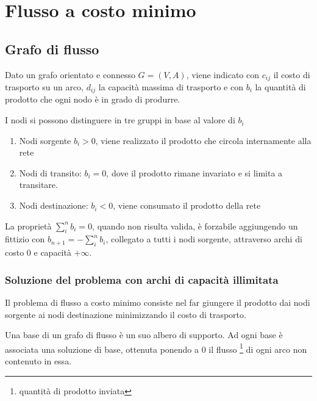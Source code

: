 \documentclass[../template]{subfiles}
\begin{document}
\section{Flusso a costo minimo}
\subsection{Grafo di flusso}
Dato un grafo orientato e connesso $G = (V, A)$, viene indicato con $c_{ij}$ il costo di trasporto su un arco, $d_{ij}$ la
capacità massima di trasporto e con $b_{i}$ la quantità di prodotto che ogni nodo è in grado di produrre.

I nodi si possono distinguere in tre gruppi in base al valore di $b_i$
\begin{enumerate}
    \item Nodi sorgente $b_i > 0$, viene realizzato il prodotto che circola internamente alla rete
    \item Nodi di transito: $b_i = 0$, dove il prodotto rimane invariato e si limita a transitare.
    \item Nodi destinazione: $b_i < 0$, viene consumato il prodotto della rete
\end{enumerate}
La proprietà $\sum_i^n b_i = 0$, quando non risulta valida, è forzabile aggiungendo un fittizio
con $b_{n+1} = -\sum_i^n b_i$, collegato a tutti i nodi sorgente, attraverso archi di costo 0 e capacità $+\infty$.

\subsubsection{Soluzione del problema con archi di capacità illimitata}
Il problema di flusso a costo minimo consiste nel far giungere il prodotto dai nodi sorgente ai nodi destinazione
minimizzando il costo di trasporto.

Una base di un grafo di flusso è un suo albero di supporto.
Ad ogni base è associata una soluzione di base, ottenuta ponendo a 0 il flusso \footnote{quantità di prodotto inviata} di ogni arco non contenuto in essa.
\end{document}
